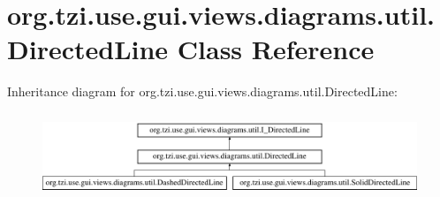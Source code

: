\hypertarget{classorg_1_1tzi_1_1use_1_1gui_1_1views_1_1diagrams_1_1util_1_1_directed_line}{\section{org.\-tzi.\-use.\-gui.\-views.\-diagrams.\-util.\-Directed\-Line Class Reference}
\label{classorg_1_1tzi_1_1use_1_1gui_1_1views_1_1diagrams_1_1util_1_1_directed_line}
}
Inheritance diagram for org.\-tzi.\-use.\-gui.\-views.\-diagrams.\-util.\-Directed\-Line\-:\begin{figure}[H]
\begin{center}
\leavevmode
\includegraphics[height=2.545455cm]{classorg_1_1tzi_1_1use_1_1gui_1_1views_1_1diagrams_1_1util_1_1_directed_line}
\end{center}
\end{figure}
